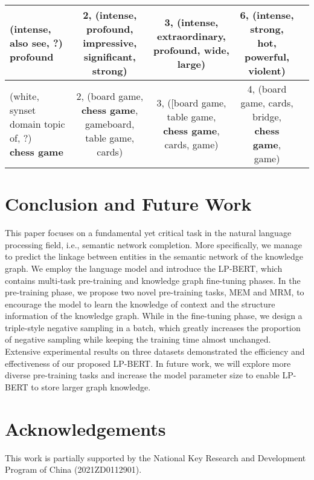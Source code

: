 \documentclass[journal]{IEEEtran}
\begin{document}
\begin{table*}[htbp]
{\begin{tabular}{l*{4}{c}}
				\midrule
				\makecell[c]{(intense, also see, ?)\\  \textbf{profound}} & 
				\makecell[c]{2, (intense, \textbf{profound}, impressive,\\significant, strong)} &
				\makecell[c]{3, (intense, extraordinary,\\\textbf{profound}, wide, large)} &
				\makecell[c]{6, (intense, strong, hot,\\powerful, violent)} \\
				\midrule
				\makecell[c]{(white, synset domain topic of, ?)\\  \textbf{chess game}} & 
				\makecell[c]{2, (board game, \textbf{chess game},\\gameboard, table game, cards)} &
				\makecell[c]{3, ([board game, table game,\\\textbf{chess game}, cards, game)} &
				\makecell[c]{4, (board game, cards, bridge,\\\textbf{chess game}, game)} \\
				
				\bottomrule
		\end{tabular}}
\end{table*}

\section{Conclusion and Future Work}{\label{conlusion}}

This paper focuses on a fundamental yet critical task in the natural language processing field, i.e., semantic network completion. More specifically, we manage to predict the linkage between entities in the semantic network of the knowledge graph.
We employ the language model and introduce the LP-BERT, which contains multi-task pre-training and knowledge graph fine-tuning phases. In the pre-training phase, we propose two novel pre-training tasks, MEM and MRM, to encourage the model to learn the knowledge of context and the structure information of the knowledge graph.
While in the fine-tuning phase, we design a triple-style negative sampling in a batch, which greatly increases the proportion of negative sampling while keeping the training time almost unchanged. Extensive experimental results on three datasets demonstrated the efficiency and effectiveness of our proposed LP-BERT.
In future work, we will explore more diverse pre-training tasks and increase the model parameter size to enable LP-BERT to store larger graph knowledge.


\section{Acknowledgements}
This work is partially supported by the National Key Research and Development Program of China (2021ZD0112901).














\ifCLASSOPTIONcaptionsoff
  \newpage
\fi
\end{document}
